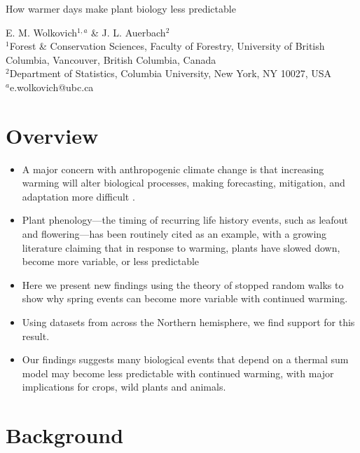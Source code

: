 \documentclass[11pt]{article}
\begin{document}
\renewcommand{\refname}{\CHead{}}

{\Large How warmer days make plant biology less predictable}

E. M. Wolkovich$^{1,a}$ \&  J. L. Auerbach$^{2}$\\

$^1$Forest \& Conservation Sciences, Faculty of Forestry, University of British Columbia, Vancouver, British Columbia, Canada\\
$^2$Department of Statistics, Columbia University, New York, NY 10027, USA\\
$^a$e.wolkovich@ubc.ca\\


\section*{Overview}

\begin{itemize}
\item A major concern with anthropogenic climate change is that increasing warming will alter biological processes, making forecasting, mitigation, and adaptation more difficult \citep{harrison2025paleoclimate}.
\item Plant phenology—the timing of recurring life history events, such as leafout and flowering—has been routinely cited as an example, with a growing literature claiming that in response to warming, plants have slowed down, become more variable, or less predictable \citep{wang2018trends,stemkovski2023disorder} 
\item Here we present new findings using the theory of stopped random walks to show why spring events can become more variable with continued warming.
\item Using datasets from across the Northern hemisphere, we find support for this result. 
\item Our findings suggests many biological events that depend on a thermal sum model may become less predictable with continued warming, with major implications for crops, wild plants and animals. 
\end{itemize}

\section*{Background}
\end{document}

